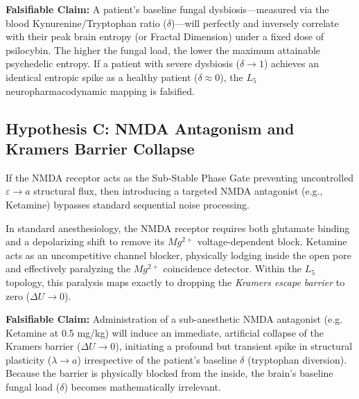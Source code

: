 \textbf{Falsifiable Claim:} A patient's baseline fungal dysbiosis---measured via the blood Kynurenine/Tryptophan ratio ($\delta$)---will perfectly and inversely correlate with their peak brain entropy (or Fractal Dimension) under a fixed dose of psilocybin. The higher the fungal load, the lower the maximum attainable psychedelic entropy. If a patient with severe dysbiosis ($\delta \to 1$) achieves an identical entropic spike as a healthy patient ($\delta \approx 0$), the $L_5$ neuropharmacodynamic mapping is falsified.

\subsection{Hypothesis C: NMDA Antagonism and Kramers Barrier Collapse}
If the NMDA receptor acts as the Sub-Stable Phase Gate preventing uncontrolled $\varepsilon \to a$ structural flux, then introducing a targeted NMDA antagonist (e.g., Ketamine) bypasses standard sequential noise processing. 

In standard anesthesiology, the NMDA receptor requires both glutamate binding and a depolarizing shift to remove its $Mg^{2+}$ voltage-dependent block. Ketamine acts as an uncompetitive channel blocker, physically lodging inside the open pore and effectively paralyzing the $Mg^{2+}$ coincidence detector. Within the $L_5$ topology, this paralysis maps exactly to dropping the \emph{Kramers escape barrier} to zero ($\Delta U \to 0$).

\textbf{Falsifiable Claim:} Administration of a sub-anesthetic NMDA antagonist (e.g. Ketamine at 0.5 mg/kg) will induce an immediate, artificial collapse of the Kramers barrier ($\Delta U \to 0$), initiating a profound but transient spike in structural plasticity ($\lambda \to a$) irrespective of the patient's baseline $\delta$ (tryptophan diversion). Because the barrier is physically blocked from the inside, the brain's baseline fungal load ($\delta$) becomes mathematically irrelevant.

